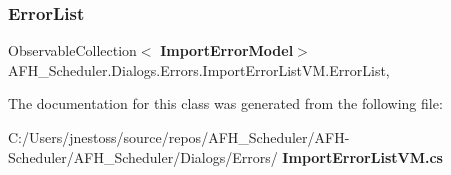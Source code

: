 \subsubsection{ErrorList}
{\footnotesize\ttfamily Observable\+Collection$<$\textbf{ Import\+Error\+Model}$>$ A\+F\+H\+\_\+\+Scheduler.\+Dialogs.\+Errors.\+Import\+Error\+List\+V\+M.\+Error\+List\hspace{0.3cm}{\ttfamily [get]}, {\ttfamily [set]}}



The documentation for this class was generated from the following file\+:\begin{DoxyCompactItemize}
\item 
C\+:/\+Users/jnestoss/source/repos/\+A\+F\+H\+\_\+\+Scheduler/\+A\+F\+H-\/\+Scheduler/\+A\+F\+H\+\_\+\+Scheduler/\+Dialogs/\+Errors/\textbf{ Import\+Error\+List\+V\+M.\+cs}\end{DoxyCompactItemize}
